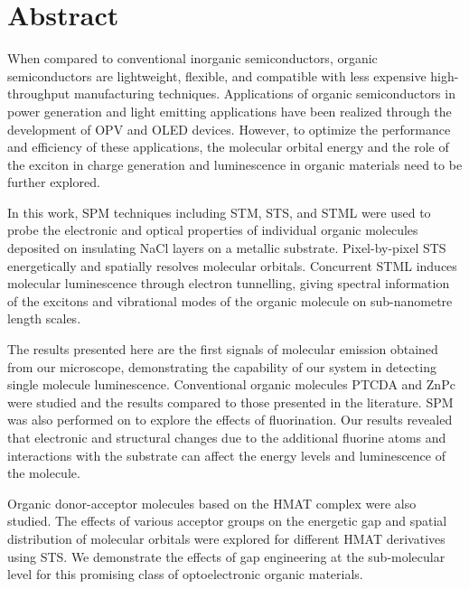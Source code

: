 


\chapter{Abstract}


When compared to conventional inorganic semiconductors, organic semiconductors are lightweight, flexible, and compatible with less expensive high-throughput manufacturing techniques. Applications of organic semiconductors in power generation and light emitting applications have been realized through the development of \ac{OPV} and \ac{OLED} devices. However, to optimize the performance and efficiency of these applications, the molecular orbital energy and the role of the exciton in charge generation and luminescence in organic materials need to be further explored.

In this work, \ac{SPM} techniques including \ac{STM}, \ac{STS}, and \ac{STML} were used to probe the electronic and optical properties of individual organic molecules deposited on insulating NaCl layers on a metallic substrate. Pixel-by-pixel \ac{STS} energetically and spatially resolves molecular orbitals. Concurrent \ac{STML} induces molecular luminescence through electron tunnelling, giving spectral information of the excitons and vibrational modes of the organic molecule on sub-nanometre length scales.

\sloppy The results presented here are the first signals of molecular emission obtained from our microscope, demonstrating the capability of our system in detecting single molecule luminescence.  Conventional organic molecules \ac{PTCDA} and \ac{ZnPc} were studied and the results compared to those presented in the literature. \ac{SPM} was also performed on  to explore the effects of fluorination. Our results revealed that electronic and structural changes due to the additional fluorine atoms and interactions with the substrate can affect the energy levels and luminescence of the molecule.

\sloppy Organic donor-acceptor molecules based on the \ac{HMAT} complex were also studied. The effects of various acceptor groups on the energetic gap and spatial distribution of molecular orbitals were explored for different \ac{HMAT} derivatives using \ac{STS}. We demonstrate the effects of gap engineering at the sub-molecular level for this promising class of optoelectronic organic materials.











